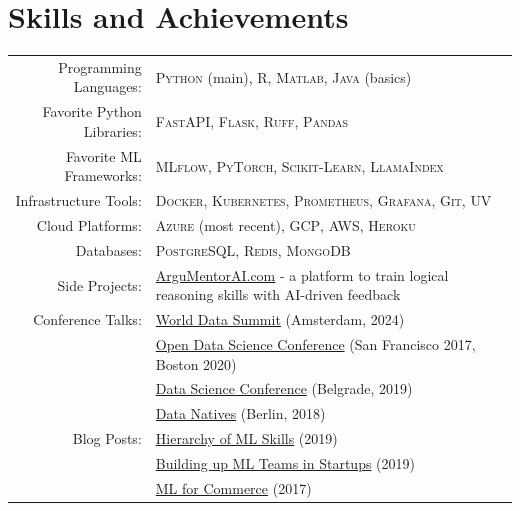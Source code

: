 \documentclass[a4paper,10pt]{article}
\begin{document}
\section{Skills and Achievements}

\hspace*{-0.5cm}\begin{tabular}{rl}

 Programming Languages: & \small \textsc{Python} (main), \textsc{R}, \textsc{Matlab}, \textsc{Java} (basics) \\[0.5mm]
 Favorite Python Libraries: & \small \textsc{FastAPI}, \textsc{Flask}, \textsc{Ruff}, \textsc{Pandas} \\[0.5mm]
 Favorite ML Frameworks: & \small \textsc{MLflow}, \textsc{PyTorch}, \textsc{Scikit-Learn}, \textsc{LlamaIndex} \\[0.5mm]
 Infrastructure Tools: & \small \textsc{Docker}, \textsc{Kubernetes}, \textsc{Prometheus}, \textsc{Grafana}, \textsc{Git}, \textsc{UV} \\[0.5mm]
 Cloud Platforms: & \small \textsc{Azure} (most recent), \textsc{GCP}, \textsc{AWS}, \textsc{Heroku} \\[0.5mm]
 Databases: & \small \textsc{PostgreSQL}, \textsc{Redis}, \textsc{MongoDB} \\[0.5mm]
 Side Projects: & \small \href{https://argumentorai.com}{ArguMentorAI.com} - a platform to train logical reasoning skills with AI-driven feedback \\[0.5mm]
 Conference Talks: & \small \href{https://worlddatasummit.com/}{World Data Summit} (Amsterdam, 2024) \\
 & \small \href{https://odsc.com}{Open Data Science Conference} (San Francisco 2017, Boston 2020) \\
 & \small \href{https://www.datasciconference.com/}{Data Science Conference} (Belgrade, 2019) \\
 & \small \href{https://datanatives.io}{Data Natives} (Berlin, 2018) \\[0.5mm]
Blog Posts: & \small \href{https://medium.com/data-science/what-separates-good-from-great-data-scientists-2906431455fd}{Hierarchy of ML Skills} (2019) \\
  & \small \href{https://techblog.commercetools.com/building-up-a-data-science-team-from-scratch-7a7b24ba9f2d}{Building up ML Teams in Startups} (2019) \\
  & \small \href{https://techblog.commercetools.com/top-5-machine-learning-applications-for-e-commerce-268eb1c89607}{ML for Commerce} (2017) \\[1mm]

\end{tabular}
\end{document}
